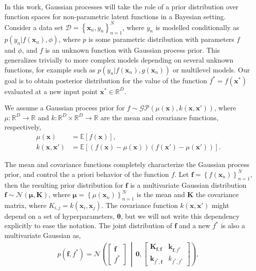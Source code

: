 \documentclass[]{interact}
\theoremstyle{plain}%
\theoremstyle{definition}
\theoremstyle{remark}
\begin{document}
In this work, Gaussian processes will take the role of a prior distribution over function spaces for non-parametric latent functions in a Bayesian setting. 
Consider a data set $\mathcal{D} = \left\lbrace \bm{x}_n, y_n \right\rbrace_{n=1}^N$, where $y_n$ is modelled conditionally as $p(y_n|f(\bm{x}_n),\phi)$, where $p$ is some parametric distribution with parameters $f$ and $\phi$, and $f$ is an unknown function with Gaussian process prior. This generalizes trivially to more complex models depending on several unknown functions, for example such as $p(y_n|f(\bm{x}_n),g(\bm{x}_n))$ or multilevel models. Our goal is to obtain posterior distribution for the value of the function $f^*=f(\bm{x}^*)$  evaluated at a new input point $\bm{x}^* \in \mathbb{R}^D$.

We assume a Gaussian process prior for $f \sim \mathcal{GP}(\mu(\bm{x}), k(\bm{x}, \bm{x}'))$, where $\mu: \mathbb{R}^D \rightarrow \mathbb{R}$ and $k: \mathbb{R}^D \times \mathbb{R}^D \rightarrow \mathbb{R}$ are the mean and covariance functions, respectively,
%
\begin{align*}
 	\mu(\bm{x}) &= \mathbb{E}\!\left[f(\bm{x})\right],\\ 
 	k(\bm{x}, \bm{x}') &= \mathbb{E}\!\left[\left( f(\bm{x}) - \mu(\bm{x}) \right)\left( f(\bm{x}') - \mu(\bm{x}') \right)\right].
\end{align*} 

The mean and covariance functions completely characterize the Gaussian process prior, and control the a priori behavior of the function $f$. Let $\bm{f}=\left\lbrace f(\bm{x}_n) \right\rbrace_{n=1}^N$, then the resulting prior distribution for $\bm{f}$ is a multivariate Gaussian distribution
$\bm{f} \sim \mathcal{N}(\bm{\mu}, \bm{K})$,
 where $\bm{\mu} = \left\lbrace \mu(\bm{x}_n) \right\rbrace_{n=1}^N$ is the mean and $\bm{K}$ the covariance matrix, where $K_{i,j}=k(\bm{x}_i,\bm{x}_j)$. The covariance function $k(\bm{x}, \bm{x}')$ might depend on a set of hyperparameters, $\bm{\theta}$, but we will not write this dependency explicitly to ease the notation.
The joint distribution of $\bm{f}$ and a new $f^*$ is also a multivariate Gaussian as,
%
\begin{align*}
p(\bm{f}, f^*)=\mathcal{N} \left( \left[ \begin{array}{cc}
\bm{f} \\ 
f^*
\end{array} \right] \,\middle|\, \bm{0},\left[ \begin{array}{cc}
\bm{K}_{\bm{f},\bm{f}} & \bm{k}_{\bm{f},f^*} \\ 
\bm{k}_{f^*,\bm{f}} & k_{f^*,f^*}
\end{array} \right] \right),
\end{align*} 
\end{document}
